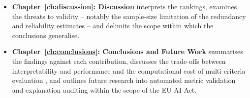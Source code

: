 \begin{itemize}
    \item \textbf{Chapter~\ref{ch:discussion}: Discussion} interprets the
    rankings, examines the threats to validity -- notably the sample-size
    limitation of the redundancy and reliability estimates -- and delimits the
    scope within which the conclusions generalise.

    \item \textbf{Chapter~\ref{ch:conclusions}: Conclusions and Future Work}
    summarises the findings against each contribution, discusses the trade-offs
    between interpretability and performance \cite{doshi2017rigorous} and the
    computational cost of multi-criteria evaluation
    \cite{hryniewska2024normensemblexai}, and outlines future research into
    automated metric validation and explanation auditing within the scope of the
    EU AI Act.
\end{itemize}
